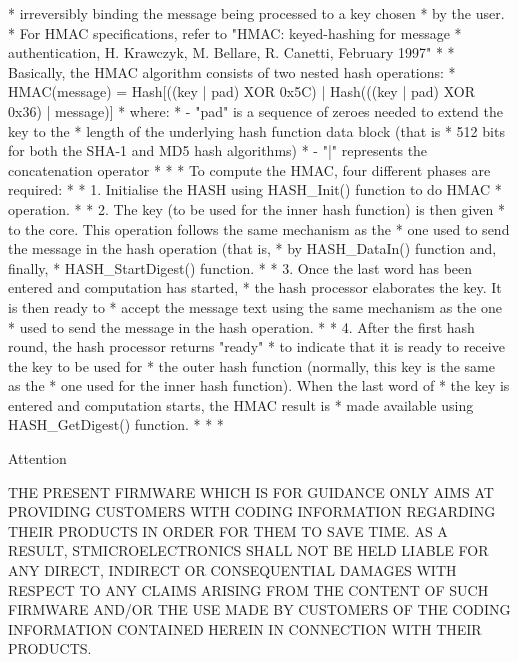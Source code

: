 \begin{DoxyVerb}
*          irreversibly binding the message being processed to a key chosen 
*          by the user. 
*          For HMAC specifications, refer to "HMAC: keyed-hashing for message 
*          authentication, H. Krawczyk, M. Bellare, R. Canetti, February 1997"
*          
*          Basically, the HMAC algorithm consists of two nested hash operations:
*          HMAC(message) = Hash[((key | pad) XOR 0x5C) | Hash(((key | pad) XOR 0x36) | message)]
*          where:
*          - "pad" is a sequence of zeroes needed to extend the key to the 
*                  length of the underlying hash function data block (that is 
*                  512 bits for both the SHA-1 and MD5 hash algorithms)
*          - "|"   represents the concatenation operator 
*          
*         
*         To compute the HMAC, four different phases are required:
*                    
*         1.  Initialise the HASH using HASH_Init() function to do HMAC 
*             operation. 
*                
*         2.  The key (to be used for the inner hash function) is then given 
*             to the core. This operation follows the same mechanism as the 
*             one used to send the message in the hash operation (that is, 
*             by HASH_DataIn() function and, finally, 
*             HASH_StartDigest() function.
*          
*         3.  Once the last word has been entered and computation has started, 
*             the hash processor elaborates the key. It is then ready to 
*             accept the message text using the same mechanism as the one 
*             used to send the message in the hash operation.
*       
*         4.  After the first hash round, the hash processor returns "ready" 
*             to indicate that it is ready to receive the key to be used for 
*             the outer hash function (normally, this key is the same as the 
*             one used for the inner hash function). When the last word of 
*             the key is entered and computation starts, the HMAC result is 
*             made available using HASH_GetDigest() function.
*               
*              
*  \end{DoxyVerb}


\begin{DoxyAttention}{Attention}

\end{DoxyAttention}
T\+HE P\+R\+E\+S\+E\+NT F\+I\+R\+M\+W\+A\+RE W\+H\+I\+CH IS F\+OR G\+U\+I\+D\+A\+N\+CE O\+N\+LY A\+I\+MS AT P\+R\+O\+V\+I\+D\+I\+NG C\+U\+S\+T\+O\+M\+E\+RS W\+I\+TH C\+O\+D\+I\+NG I\+N\+F\+O\+R\+M\+A\+T\+I\+ON R\+E\+G\+A\+R\+D\+I\+NG T\+H\+E\+IR P\+R\+O\+D\+U\+C\+TS IN O\+R\+D\+ER F\+OR T\+H\+EM TO S\+A\+VE T\+I\+ME. AS A R\+E\+S\+U\+LT, S\+T\+M\+I\+C\+R\+O\+E\+L\+E\+C\+T\+R\+O\+N\+I\+CS S\+H\+A\+LL N\+OT BE H\+E\+LD L\+I\+A\+B\+LE F\+OR A\+NY D\+I\+R\+E\+CT, I\+N\+D\+I\+R\+E\+CT OR C\+O\+N\+S\+E\+Q\+U\+E\+N\+T\+I\+AL D\+A\+M\+A\+G\+ES W\+I\+TH R\+E\+S\+P\+E\+CT TO A\+NY C\+L\+A\+I\+MS A\+R\+I\+S\+I\+NG F\+R\+OM T\+HE C\+O\+N\+T\+E\+NT OF S\+U\+CH F\+I\+R\+M\+W\+A\+RE A\+N\+D/\+OR T\+HE U\+SE M\+A\+DE BY C\+U\+S\+T\+O\+M\+E\+RS OF T\+HE C\+O\+D\+I\+NG I\+N\+F\+O\+R\+M\+A\+T\+I\+ON C\+O\+N\+T\+A\+I\+N\+ED H\+E\+R\+E\+IN IN C\+O\+N\+N\+E\+C\+T\+I\+ON W\+I\+TH T\+H\+E\+IR P\+R\+O\+D\+U\+C\+TS.

